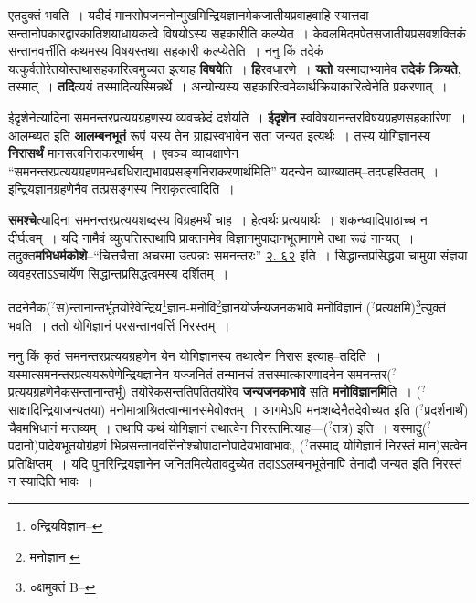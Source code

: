\documentclass[article,12pt,a4paper]{memoir}
\newcommand{\unclear}[1]{($^{?}$#1)}
\begin{document}
	  \pstart एतदुक्तं भवति । यदीदं मानसोपजननोन्मुखमिन्द्रियज्ञानमेकजातीयप्रवाहवाहि स्यात्तदा सन्तानोपकारद्वारकातिशयाधायकत्वे विषयोऽस्य सहकारीति कल्प्येत । केवलमिदमपेतसजातीयप्रसवशक्तिकं सन्तानवर्त्तीति कथमस्य विषयस्तथा सहकारी कल्प्येतेति । ननु किं तदेकं यत्कुर्वतोरेतयोस्तथासहकारित्वमुच्यत इत्याह \textbf{विषये}ति । \textbf{हि}रवधारणे । \textbf{यतो} यस्मादाभ्यामेव \textbf{तदेकं क्रियते,} तस्मात् । \textbf{तदि}त्ययं तस्मादित्यस्मिन्नर्थे । अन्योन्यस्य सहकारित्वमेकार्थक्रियाकारित्वेनेति प्रकरणात् ।
	\pend
      

	  \pstart ईदृशेनेत्यादिना समनन्तरप्रत्ययग्रहणस्य व्यवच्छेदं दर्शयति । \textbf{ईदृशेन} स्वविषयानन्तरविषयग्रह\leavevmode{}णसहकारिणा । आलम्ब्यत इति \textbf{आलम्बनभूतं} रूपं यस्य तेन ग्राह्यस्वभावेन सता जन्यत इत्यर्थः । तस्य योगिज्ञानस्य \textbf{निरासर्थं} मानसत्वनिराकरणार्थम् । एवञ्च व्याचक्षाणेन “समनन्तरप्रत्ययग्रहणमन्धबधिराद्यभावप्रसङ्गनिराकरणार्थमिति” यदन्येन व्याख्यातम्--तदपहस्तितम् । इन्द्रियज्ञानग्रहणेनैव तत्प्रसङ्गस्य निराकृतत्वादिति ।
	\pend
      

	  \pstart \textbf{समश्चे}त्यादिना समनन्तरप्रत्ययशब्दस्य विग्रहमर्थं चाह । हेत्वर्थः प्रत्ययार्थः । शकन्ध्वादिपाठाच्च न दीर्घत्वम् । यदि नामैवं व्युत्पत्तिस्तथापि प्राक्तनमेव विज्ञानमुपादानभूतमागमे तथा रूढं नान्यत् । तदुक्त\textbf{मभिधर्मकोशे}--“चित्तचैत्ता अचरमा उत्पन्नाः समनन्तरः” \href{http://http://sarit.indology.info/?cref=ak.2.62}{२. ६२} इति । सिद्धान्तप्रसिद्धया चामुया संज्ञया व्यवहरताऽऽचार्येण सिद्धान्तप्रसिद्धत्वमस्य दर्शितम् ।
	\pend
      \leavevmode{}
	  \bigskip
	  \begingroup
	

	  \pstart तदनेनैक\unclear{स}न्तानान्तर्भूतयोरेवेन्द्रिय\footnote{०न्द्रियविज्ञान--\cite{dp-msC}}ज्ञान-मनोवि\footnote{मनोज्ञान \cite{dp-msA} \cite{dp-msB} \cite{dp-edP} \cite{dp-edH} \cite{dp-edE}}ज्ञानयोर्जन्यजनकभावे मनोविज्ञानं \unclear{प्रत्यक्षमि}\footnote{०क्षमुक्तं B--}त्युक्तं भवति । ततो योगिज्ञानं परसन्तानवर्त्ति निरस्तम् ।
	\pend
      
	  \endgroup
	

	  \pstart ननु किं कृतं समनन्तरप्रत्ययग्रहणेन येन योगिज्ञानस्य तथात्वेन निरास इत्याह--तदिति । यस्मात्समनन्तरप्रत्ययरूपेणेन्द्रियज्ञानेन यज्जनितं तन्मानसं तत्तस्मात्कारणादनेन समनन्तर\unclear{प्रत्ययग्रहणेनैकसन्तानान्तर्भू} तयोरेकसन्ततिपतितयोरेव \textbf{जन्यजनकभावे} सति \textbf{मनोविज्ञानमि}ति । \unclear{साक्षादिन्द्रियाजन्यतया} मनोमात्राश्रितत्वान्मानसमेवोक्तम् । आगमेऽपि मनःशब्देनैतदेवोच्यत इति \unclear{प्रदर्शनार्थं} चैवमभिधानं मन्तव्यम् । तथापि कथं योगिज्ञानं तथात्वेन निरस्तमित्याह—\unclear{तत्र} इति । यस्मादु\unclear{पदानो}पादेयभूतयोर्ग्रहणं भिन्नसन्तानवर्त्तिनोश्चोपादानोपादेयभावाभावः, \unclear{तस्माद् योगिज्ञानं निरस्तं मान}सत्वेन प्रतिक्षिप्तम् । यदि पुनरिन्द्रियज्ञानेन जनितमित्येतावदुच्येत तदाऽऽलम्बनभूतेनापि तेनादौ जन्यत इति निरस्तं न स्यादिति भावः ।
	\pend
      
\end{document}
